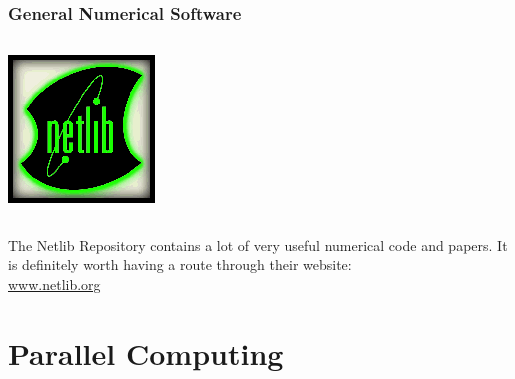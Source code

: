 \documentclass[smaller,handout,table]{beamer}
\begin{document}
\begin{frame}
\frametitle{General Numerical Software}
\begin{center}
\begin{columns}
\begin{column}{0.3\textwidth}
\includegraphics[width=\textwidth]{netlib.png}\\
\end{column}
\end{columns}
The Netlib Repository contains a lot of very useful numerical code and papers. It is definitely worth having a route through their website:\\
\url{www.netlib.org}
\end{center}
\end{frame}

\section{Parallel Computing}
\end{document}
